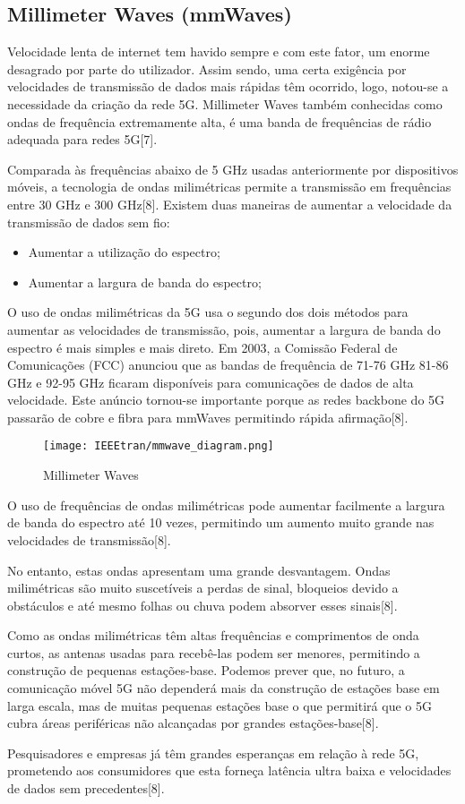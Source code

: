 \documentclass[conference]{IEEEtran}
\begin{document}
\subsection{Millimeter Waves (mmWaves)}
Velocidade lenta de internet tem havido sempre e com este fator, um enorme desagrado por parte do utilizador. Assim sendo, uma certa exigência por velocidades de transmissão de dados mais rápidas têm ocorrido, logo, notou-se a necessidade da criação da rede 5G. Millimeter Waves também conhecidas como ondas de frequência extremamente alta, é uma banda de frequências de rádio adequada para redes 5G[7]. \par
Comparada às frequências abaixo de 5 GHz usadas anteriormente por dispositivos móveis, a tecnologia de ondas milimétricas permite a transmissão em frequências entre 30 GHz e 300 GHz[8].
Existem duas maneiras de aumentar a velocidade da transmissão de dados sem fio:
\begin{itemize}
    \item Aumentar a utilização do espectro;
    \item Aumentar a largura de banda do espectro;
\end{itemize}
O uso de ondas milimétricas da 5G usa o segundo dos dois métodos para aumentar as velocidades de transmissão, pois, aumentar a largura de banda do espectro é mais simples e mais direto. Em 2003, a Comissão Federal de Comunicações (FCC) anunciou que as bandas de frequência de 71-76 GHz 81-86 GHz e 92-95 GHz ficaram disponíveis para comunicações de dados de alta velocidade. Este anúncio tornou-se importante porque as redes backbone do 5G passarão de cobre e fibra para mmWaves permitindo rápida afirmação[8].
\begin{figure}[ht]
    \centering
    \texttt{[image: IEEEtran/mmwave\_diagram.png]}
    \caption{Millimeter Waves}
\end{figure}
O uso de frequências de ondas milimétricas pode aumentar facilmente a largura de banda do espectro até 10 vezes, permitindo um aumento muito grande nas velocidades de transmissão[8].\par
No entanto, estas ondas apresentam uma grande desvantagem. Ondas milimétricas são muito suscetíveis a perdas de sinal, bloqueios devido a obstáculos e até mesmo folhas ou chuva podem absorver esses sinais[8]. \par
Como as ondas milimétricas têm altas frequências e comprimentos de onda curtos, as antenas usadas para recebê-las podem ser menores, permitindo a construção de pequenas estações-base. Podemos prever que, no futuro, a comunicação móvel 5G não dependerá mais da construção de estações base em larga escala, mas de muitas pequenas estações base o que permitirá que o 5G cubra áreas periféricas não alcançadas por grandes estações-base[8].\par
Pesquisadores e empresas já têm grandes esperanças em relação à rede 5G, prometendo aos consumidores que esta forneça latência ultra baixa e velocidades de dados sem precedentes[8].
\end{document}
